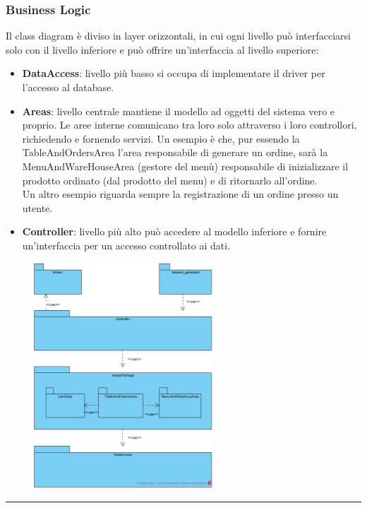 \subsubsection{Business Logic}
Il class diagram è diviso in layer orizzontali, in cui ogni livello può interfacciarsi solo con il livello inferiore e può offrire un'interfaccia al livello superiore:
\begin{itemize}
	\item \textbf{DataAccess}: livello più basso si occupa di implementare il driver per l'accesso al database.
	\item \textbf{Areas}: livello centrale mantiene il modello ad oggetti del sistema vero e proprio. Le aree interne comunicano tra loro solo attraverso i loro controllori, richiedendo e fornendo servizi.
	Un esempio è che, pur essendo la TableAndOrdersArea l’area responsabile di generare un ordine, sarà la MenuAndWareHouseArea (gestore del menù) responsabile di inizializzare il prodotto ordinato (dal prodotto del menu) e di ritornarlo all’ordine.
	\\Un altro esempio riguarda sempre la registrazione di un ordine presso un utente.
	\item \textbf{Controller}: livello più alto può accedere al modello inferiore e fornire un'interfaccia per un accesso controllato ai dati.
\end{itemize}
\begin{figure}[H]
	\centering
	\includegraphics[width=0.6\textwidth]{Immagini/business_logic.jpg}
\end{figure}
\hrule
\vspace{0.5cm}

